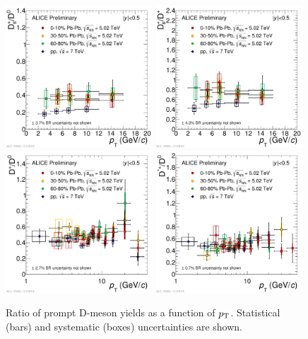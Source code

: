 \begin{figure}[!h]
 \begin{center}
\includegraphics[width=0.49\textwidth]{FigCap5/RatioDsD0-PbPb-010-3050-6080-502-pp-7.pdf}
\includegraphics[width=0.49\textwidth]{FigCap5/RatioDsDplus-PbPb-010-3050-6080-502-pp-7.pdf}
\includegraphics[width=0.49\textwidth]{FigCap5/RatioDplusDzero-PbPb-010-3050-6080-502-pp-7.pdf}
\includegraphics[width=0.49\textwidth]{FigCap5/RatioDstarDzero-PbPb-010-3050-6080-502-pp-7.pdf}
 \end{center}
 \caption{Ratio of prompt D-meson yields as a function of $p_{\rm T}$.
Statistical (bars) and systematic (boxes) uncertainties are shown.}
 \label{fig:DmesRatio} 
\end{figure} 

